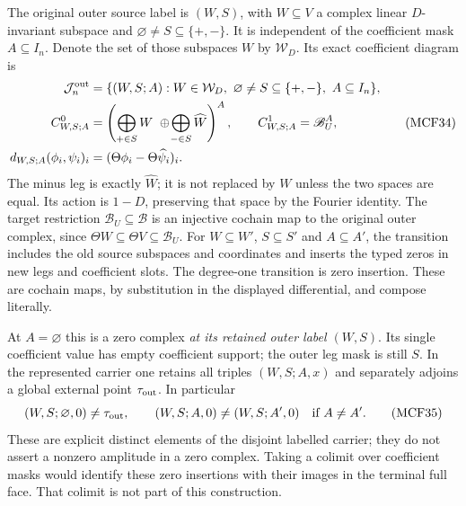 \documentclass[11pt,a4paper]{article}
\begin{document}
The original outer source label is $(W,S)$, with $W\subseteq V$ a
complex linear $D$-invariant subspace and
$\varnothing\ne S\subseteq\{+,-\}$.  It is independent
of the coefficient mask $A\subseteq I_n$.  Denote the set of those subspaces
$W$ by $\mathcal W_D$.  Its exact coefficient diagram is
\[
\begin{split}
\mathcal J_n^{\rm out}&=\{(W,S;A): W\in\mathcal W_D,
       \ \varnothing\ne S\subseteq\{+,-\},\ A\subseteq I_n\},\\
C_{W,S;A}^0&=
 \left(\bigoplus_{+\in S}W\ \oplus\!
                          \bigoplus_{-\in S}\widehat W\right)^A,
\qquad C_{W,S;A}^1=\mathscr B_U^A,\\
d_{W,S;A}(\phi_i,\psi_i)_i
      &=(\Theta\phi_i-\Theta\widehat\psi_i)_i.
\end{split}
\tag{MCF34}
\]
The minus leg is exactly $\widehat W$; it is not replaced by $W$ unless
the two spaces are equal.  Its action is $1-D$, preserving that space
by the Fourier identity.  The target restriction $\mathscr B_U\subseteq
\mathscr B$ is an injective cochain map to the original outer complex,
since $\Theta W\subseteq\Theta V\subseteq\mathscr B_U$.
For $W\subseteq W'$, $S\subseteq S'$ and $A\subseteq A'$, the
transition includes the old source subspaces and coordinates and inserts
the typed zeros in new legs and coefficient slots.  The degree-one
transition is zero insertion.  These are cochain maps, by substitution
in the displayed differential, and compose literally.

At $A=\varnothing$ this is a zero complex \emph{at its retained outer
label $(W,S)$}.  Its single coefficient value has empty coefficient
support; the outer leg mask is still $S$.  In the represented carrier
one retains all triples $(W,S;A,x)$ and separately adjoins a global
external point $\tau_{\rm out}$.  In particular
\[
(W,S;\varnothing,0)\ne\tau_{\rm out},\qquad
(W,S;A,0)\ne(W,S;A',0)\quad\text{if }A\ne A'.
\tag{MCF35}
\]
These are explicit distinct elements of the disjoint labelled carrier;
they do not assert a nonzero amplitude in a zero complex.  Taking a
colimit over coefficient masks would identify these zero insertions
with their images in the terminal full face.  That colimit is not part
of this construction.
\end{document}
